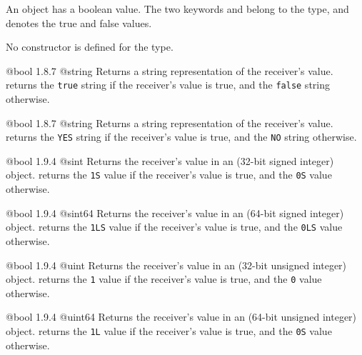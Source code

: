 

An  object has a boolean value. The two keywords  and  belong to the  type, and denotes the true and false values.

No constructor is defined for the  type.

{@bool}
{1.8.7}
{@string}
{Returns a string representation of the receiver's value.}
{returns the \texttt{\textquotedbl true\textquotedbl} string if the receiver's value is true, and the \texttt{\textquotedbl false\textquotedbl} string otherwise.}







{@bool}
{1.8.7}
{@string}
{Returns a string representation of the receiver's value.}
{returns the \texttt{\textquotedbl YES\textquotedbl} string if the receiver's value is true, and the \texttt{\textquotedbl NO\textquotedbl} string otherwise.}




{@bool}
{1.9.4}
{@sint}
{Returns the receiver's value in an  (32-bit signed integer) object.}
{returns the \texttt{1S}  value if the receiver's value is true, and the \texttt{0S}  value otherwise.}




{@bool}
{1.9.4}
{@sint64}
{Returns the receiver's value in an  (64-bit signed integer) object.}
{returns the \texttt{1LS}  value if the receiver's value is true, and the \texttt{0LS}  value otherwise.}




{@bool}
{1.9.4}
{@uint}
{Returns the receiver's value in an  (32-bit unsigned integer) object.}
{returns the \texttt{1}  value if the receiver's value is true, and the \texttt{0}  value otherwise.}




{@bool}
{1.9.4}
{@uint64}
{Returns the receiver's value in an  (64-bit unsigned integer) object.}
{returns the \texttt{1L}  value if the receiver's value is true, and the \texttt{0S}  value otherwise.}




